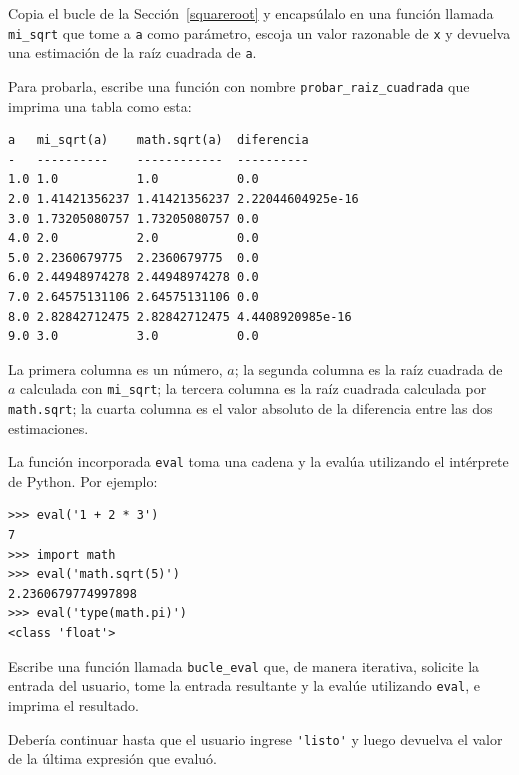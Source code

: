 \documentclass[10pt]{book}
\begin{document}
\begin{exercise}

Copia el bucle de la Sección~\ref{squareroot}
y encapsúlalo en una función llamada
\verb"mi_sqrt" que tome a {\tt a} como parámetro, escoja un
valor razonable de {\tt x} y devuelva una estimación de la raíz
cuadrada de {\tt a}.  

Para probarla, escribe una función con nombre \verb"probar_raiz_cuadrada"
que imprima una tabla como esta:

\begin{verbatim}
a   mi_sqrt(a)    math.sqrt(a)  diferencia
-   ----------    ------------  ----------
1.0 1.0           1.0           0.0
2.0 1.41421356237 1.41421356237 2.22044604925e-16
3.0 1.73205080757 1.73205080757 0.0
4.0 2.0           2.0           0.0
5.0 2.2360679775  2.2360679775  0.0
6.0 2.44948974278 2.44948974278 0.0
7.0 2.64575131106 2.64575131106 0.0
8.0 2.82842712475 2.82842712475 4.4408920985e-16
9.0 3.0           3.0           0.0
\end{verbatim}
%
La primera columna es un número, $a$; la segunda columna es la raíz
cuadrada de $a$ calculada con \verb"mi_sqrt"; la tercera columna es la
raíz cuadrada calculada por {\tt math.sqrt}; la cuarta columna es el
valor absoluto de la diferencia entre las dos estimaciones.
\end{exercise}


\begin{exercise}

La función incorporada {\tt eval} toma una cadena y la evalúa
utilizando el intérprete de Python.  Por ejemplo:

\begin{verbatim}
>>> eval('1 + 2 * 3')
7
>>> import math
>>> eval('math.sqrt(5)')
2.2360679774997898
>>> eval('type(math.pi)')
<class 'float'>
\end{verbatim}
%
Escribe una función llamada \verb"bucle_eval" que, de manera iterativa,
solicite la entrada del usuario, tome la entrada resultante y la evalúe
utilizando {\tt eval}, e imprima el resultado.

Debería continuar hasta que el usuario ingrese \verb"'listo'" y luego
devuelva el valor de la última expresión que evaluó.

\end{exercise}
\end{document}
